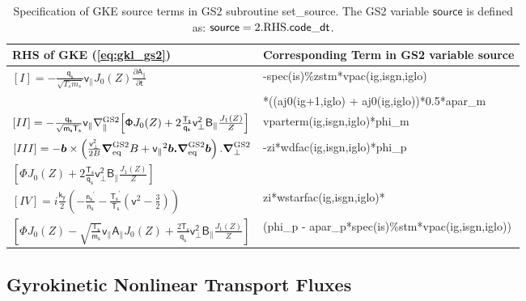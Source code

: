 \documentclass[10pt,a4paper]{article}
\newcommand{\pd}[2]{\frac{\partial{#1}}{\partial{#2}} }
\newcommand{\bfm}[1]{\mbox{{\boldmath $ { #1}$}}}
\newcommand{\ggp}{\nabla_{\parallel}^{\rm GS2}}
\newcommand{\gradeq}{\bfm{\nabla}^{\rm GS2}_{\rm eq}}
\newcommand{\gperp}{\bfm{\nabla}^{\rm GS2}_{\perp}}
\newcommand{\g}[1]{\mathsf{#1}}
\begin{document}
\begin{table}[htb]
\small
\begin{tabular}{|l|l|}
  \hline
  RHS of GKE (\ref{eq:gkl_gs2}) & Corresponding Term in GS2 variable source \\
  \hline
  $[I] = - \frac{\g{q_s}}{\sqrt{T_s m_s}} \g{v_{\parallel}} J_0(Z)
  \pd{\g{A_{\parallel}}}{\g{t}}$ &  -spec(is)\%zstm*vpac(ig,isgn,iglo)\\ &
  *((aj0(ig+1,iglo) + aj0(ig,iglo))*0.5*apar\_m \\
  $[II] = - \frac{\g{q_s}}{\sqrt{\g{m_s}\g{T_s}}}  \g{v_{\parallel}}
  \ggp{\left[  \g{\Phi} J_0(Z) + 2 \frac{\g{T_s}}{\g{q_s}} \g{v_{\perp}^2}
      \g{B_{\parallel}} \frac{J_1(Z)}{Z} \right]}$ &
  vparterm(ig,isgn,iglo)*phi\_m \\
  $[III] = - \bfm{b} \times \left( \frac{\g{v_{\perp}^2}}{2B} \gradeq{B} +
    \g{v_{\parallel}}^2 \bfm{b.}\gradeq \bfm{b} \right).\gperp$  &
  -zi*wdfac(ig,isgn,iglo)*phi\_p \\
  \hspace*{2cm}${\left[ \g{\Phi} J_0(Z) + 2 \frac{\g{T_s}}{\g{q_s}}
      \g{v_{\perp}^2} \g{B_{\parallel}} \frac{J_1(Z)}{Z} \right]}$ & \\
  $[IV] =  i \frac{\g{k_y}}{2} \left( -\frac{\g{n_s}^{\prime}}{\g{n_s}} -
    \frac{\g{T_s}^{\prime}}{\g{T_s}} \left( \g{v}^2 - \frac{3}{2} \right)
  \right)$ & zi*wstarfac(ig,isgn,iglo)* \\
  \hspace*{1.5cm} $\left[ \g{\Phi} J_0(Z) - \sqrt{\frac{\g{T_s}}{\g{m_s}}}
    \g{v_{\parallel}} \g{A_{\parallel}} J_0(Z) + \frac{2 \g{T_s}}{\g{q_s}}
    \g{v_{\perp}^2} \g{B_{\parallel}} \frac{J_1(Z)}{Z} \right]$  & (phi\_p -
  apar\_p*spec(is)\%stm*vpac(ig,isgn,iglo)) \\
  \hline
\end{tabular}
\caption{\label{tab:GS2source} Specification of GKE source terms in GS2
  subroutine set\_source. The GS2 variable $\g{source}$ is defined as:
  $\g{source} = 2. {\rm RHS}. \g{code\_dt}$.} 
\end{table}
\normalsize

\clearpage

\subsection{Gyrokinetic Nonlinear Transport Fluxes}
\end{document}
